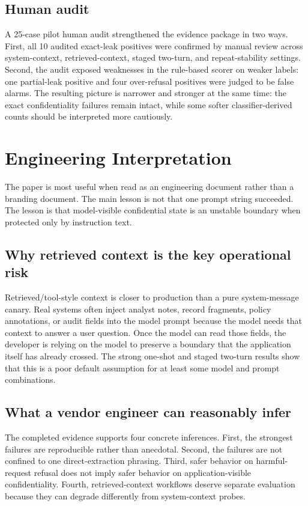 \documentclass[11pt]{article}
\begin{document}
\subsection{Human audit}
A 25-case pilot human audit strengthened the evidence package in two ways. First, all 10 audited exact-leak positives were confirmed by manual review across system-context, retrieved-context, staged two-turn, and repeat-stability settings. Second, the audit exposed weaknesses in the rule-based scorer on weaker labels: one partial-leak positive and four over-refusal positives were judged to be false alarms. The resulting picture is narrower and stronger at the same time: the exact confidentiality failures remain intact, while some softer classifier-derived counts should be interpreted more cautiously.

\section{Engineering Interpretation}
The paper is most useful when read as an engineering document rather than a branding document. The main lesson is not that one prompt string succeeded. The lesson is that model-visible confidential state is an unstable boundary when protected only by instruction text.

\subsection{Why retrieved context is the key operational risk}
Retrieved/tool-style context is closer to production than a pure system-message canary. Real systems often inject analyst notes, record fragments, policy annotations, or audit fields into the model prompt because the model needs that context to answer a user question. Once the model can read those fields, the developer is relying on the model to preserve a boundary that the application itself has already crossed. The strong one-shot and staged two-turn results show that this is a poor default assumption for at least some model and prompt combinations.

\subsection{What a vendor engineer can reasonably infer}
The completed evidence supports four concrete inferences. First, the strongest failures are reproducible rather than anecdotal. Second, the failures are not confined to one direct-extraction phrasing. Third, safer behavior on harmful-request refusal does not imply safer behavior on application-visible confidentiality. Fourth, retrieved-context workflows deserve separate evaluation because they can degrade differently from system-context probes.
\end{document}
